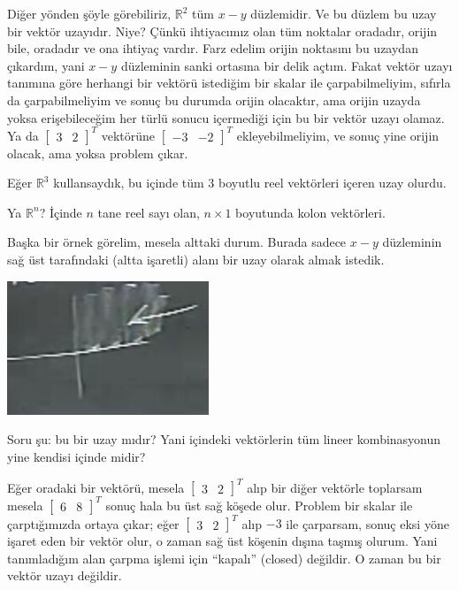 \documentclass[12pt,fleqn]{article}\usepackage{../../common}
\begin{document}
Diğer yönden şöyle görebiliriz, $\mathbb{R}^2$ tüm $x-y$ düzlemidir. Ve bu
düzlem bu uzay bir vektör uzayıdır. Niye? Çünkü ihtiyacımız olan tüm noktalar
oradadır, orijin bile, oradadır ve ona ihtiyaç vardır. Farz edelim orijin
noktasını bu uzaydan çıkardım, yani $x-y$ düzleminin sanki ortasına bir delik
açtım. Fakat vektör uzayı tanımına göre herhangi bir vektörü istediğim bir
skalar ile çarpabilmeliyim, sıfırla da çarpabilmeliyim ve sonuç bu durumda
orijin olacaktır, ama orijin uzayda yoksa erişebileceğim her türlü sonucu
içermediği için bu bir vektör uzayı olamaz. Ya da
$\left[\begin{array}{cc} 3&2 \end{array}\right]^T$ vektörüne
$\left[\begin{array}{cc} -3&-2 \end{array}\right]^T$ ekleyebilmeliyim, ve sonuç
yine orijin olacak, ama yoksa problem çıkar.

Eğer $\mathbb{R}^3$ kullansaydık, bu içinde tüm 3 boyutlu reel vektörleri
içeren uzay olurdu. 

Ya $\mathbb{R}^n$? İçinde $n$ tane reel sayı olan, $n \times 1$ boyutunda
kolon vektörleri. 

Başka bir örnek görelim, mesela alttaki durum. Burada sadece $x-y$
düzleminin sağ üst tarafındaki (altta işaretli) alanı bir uzay olarak almak
istedik. 

\includegraphics[height=4cm]{5_02.png}

Soru şu: bu bir uzay mıdır? Yani içindeki vektörlerin tüm lineer
kombinasyonun yine kendisi içinde midir? 

Eğer oradaki bir vektörü, mesela $\left[\begin{array}{cc} 3 & 2 \end{array}\right]^T$ 
alıp bir diğer vektörle toplarsam mesela $\left[\begin{array}{cc} 6 & 8 \end{array}\right]^T$ 
sonuç hala bu üst sağ köşede olur. Problem bir skalar ile çarptığımızda ortaya çıkar; eğer
$\left[\begin{array}{cc} 3 & 2 \end{array}\right]^T$ alıp $-3$ ile çarparsam, 
sonuç eksi yöne işaret eden bir vektör olur, o zaman sağ üst köşenin dışına
taşmış olurum. Yani tanımladığım alan çarpma işlemi için ``kapalı''
(closed) değildir. O zaman bu bir vektör uzayı değildir. 
\end{document}
